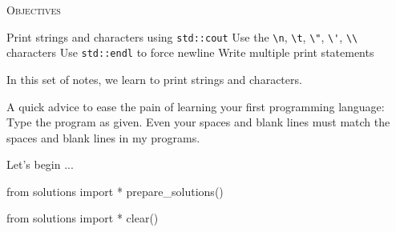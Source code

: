 
\textsc{Objectives}
\begin{myenum}
\li Print strings and characters using \verb!std::cout!
\li Use the \verb!\n!, \verb!\t!, \verb!\"!, \verb!\'!, 
    \verb!\\! characters
\li Use \verb!std::endl! to force newline
\li Write multiple print statements
\end{myenum}

In this set of notes, we learn to print strings and characters.

A quick advice to ease the pain of learning your first programming language: 
Type the program 
 as given. 
Even your spaces and blank lines must match the spaces 
and blank lines in my programs.

Let's begin ...

 
 
 
 




\begin{python0}
from solutions import *
prepare_solutions()
\end{python0}

\begin{python0}
from solutions import *
clear()
\end{python0}

